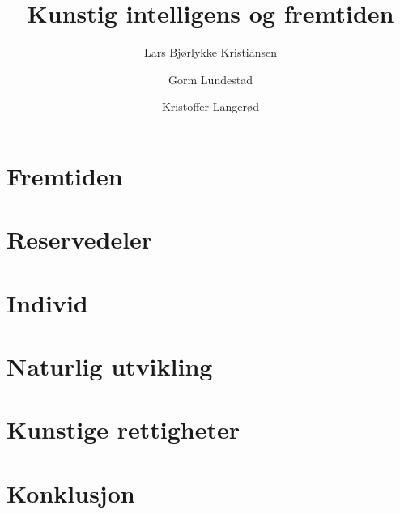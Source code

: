 \documentclass[norsk]{inf0105}
\title{Kunstig intelligens og fremtiden}
\author{Lars Bjørlykke Kristiansen
	\and Gorm Lundestad
	\and Kristoffer Langerød}
\begin{document}
\maketitle

\begin{ingress}
	
\end{ingress}

\section*{Fremtiden}

\section*{Reservedeler}

\section*{Individ}

\section*{Naturlig utvikling}

\section*{Kunstige rettigheter}

\section*{Konklusjon}

\end{document}
